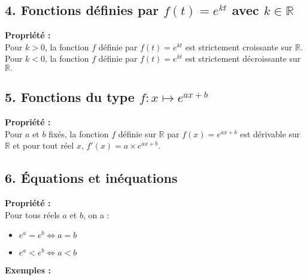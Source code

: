 \documentclass[11pt,a4paper]{article}
\begin{document}
\subsection*{4. Fonctions définies par $f(t)=e^{kt}$ avec $k\in\mathbb{R}$}

\begin{mdframed}[style=proprieteStyle]
    \textbf{Propriété :} ~\\
    Pour $k>0$, la fonction $f$ définie par $f(t)=e^{kt}$ est strictement croissante sur $\mathbb{R}.$ \\
    Pour $k<0$, la fonction $f$ définie par $f(t)=e^{kt}$ est strictement décroissante sur $\mathbb{R}.$ 
\end{mdframed}

\subsection*{5. Fonctions du type $f:x\mapsto e^{ax+b}$}

\begin{mdframed}[style=proprieteStyle]
    \textbf{Propriété :} ~\\
    Pour $a$ et $b$ fixés, la fonction $f$ définie sur $\mathbb{R}$ par $f(x)=e^{ax+b}$ est dérivable sur $\mathbb{R}$ et pour tout réel $x$, $f'(x)=a\times e^{ax+b}$.
\end{mdframed}

\newpage

\subsection*{6. Équations et inéquations}

\begin{mdframed}[style=proprieteStyle]
    \textbf{Propriété :} ~\\
    Pour tous réels $a$ et $b$, on a :
    \vspace{-4pt}
    \begin{itemize}
        \item $e^a=e^b \Leftrightarrow a=b$
        \item $e^a<e^b \Leftrightarrow a<b$
    \end{itemize}
\end{mdframed}

\textbf{Exemples :} ~\\
\end{document}
